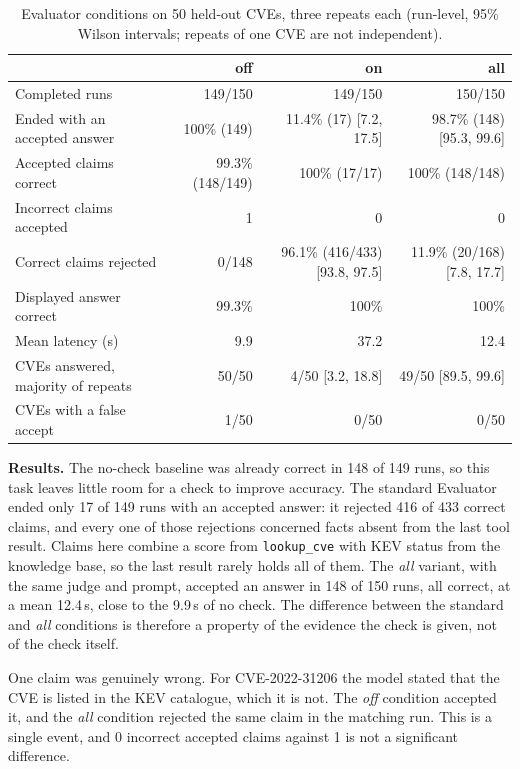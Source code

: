 \documentclass[conference]{IEEEtran}
\begin{document}
\begin{table}[t]
\caption{Evaluator conditions on 50 held-out CVEs, three repeats each (run-level,
95\% Wilson intervals; repeats of one CVE are not independent).}
\label{tab:onoff}
\centering
\small
\begin{tabular}{@{}lrrr@{}}
\toprule
 & \textbf{off} & \textbf{on} & \textbf{all} \\
\midrule
Completed runs & 149/150 & 149/150 & 150/150 \\
Ended with an accepted answer & 100\% (149) & 11.4\% (17) [7.2, 17.5] & 98.7\% (148) [95.3, 99.6] \\
Accepted claims correct & 99.3\% (148/149) & 100\% (17/17) & 100\% (148/148) \\
Incorrect claims accepted & 1 & 0 & 0 \\
Correct claims rejected & 0/148 & 96.1\% (416/433) [93.8, 97.5] & 11.9\% (20/168) [7.8, 17.7] \\
Displayed answer correct & 99.3\% & 100\% & 100\% \\
Mean latency (s) & 9.9 & 37.2 & 12.4 \\
\midrule
CVEs answered, majority of repeats & 50/50 & 4/50 [3.2, 18.8] & 49/50 [89.5, 99.6] \\
CVEs with a false accept & 1/50 & 0/50 & 0/50 \\
\bottomrule
\end{tabular}
\end{table}

\textbf{Results.} The no-check baseline was already correct in 148 of 149 runs, so
this task leaves little room for a check to improve accuracy. The standard
Evaluator ended only 17 of 149 runs with an accepted answer: it rejected 416 of 433
correct claims, and every one of those rejections concerned facts absent from the
last tool result. Claims here combine a score from \texttt{lookup\_cve} with KEV
status from the knowledge base, so the last result rarely holds all of them. The
\emph{all} variant, with the same judge and prompt, accepted an answer in 148 of
150 runs, all correct, at a mean 12.4\,s, close to the 9.9\,s of no check. The
difference between the standard and \emph{all} conditions is therefore a property
of the evidence the check is given, not of the check itself.

One claim was genuinely wrong. For CVE-2022-31206 the model stated that the CVE is
listed in the KEV catalogue, which it is not. The \emph{off} condition accepted
it, and the \emph{all} condition rejected the same claim in the matching run.
This is a single event, and 0 incorrect accepted claims against 1 is not a
significant difference.
\end{document}
